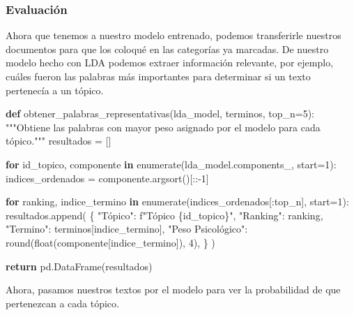 \documentclass[
  spanish,
  letterpaper,
  DIV=11,
  numbers=noendperiod]{scrartcl}
\newenvironment{Shaded}{\begin{snugshade}}{\end{snugshade}}
\newcommand{\BuiltInTok}[1]{\textcolor[rgb]{0.00,0.23,0.31}{#1}}
\newcommand{\CommentTok}[1]{\textcolor[rgb]{0.37,0.37,0.37}{#1}}
\newcommand{\ControlFlowTok}[1]{\textcolor[rgb]{0.00,0.23,0.31}{\textbf{#1}}}
\newcommand{\DecValTok}[1]{\textcolor[rgb]{0.68,0.00,0.00}{#1}}
\newcommand{\KeywordTok}[1]{\textcolor[rgb]{0.00,0.23,0.31}{\textbf{#1}}}
\newcommand{\NormalTok}[1]{\textcolor[rgb]{0.00,0.23,0.31}{#1}}
\newcommand{\OperatorTok}[1]{\textcolor[rgb]{0.37,0.37,0.37}{#1}}
\newcommand{\SpecialCharTok}[1]{\textcolor[rgb]{0.37,0.37,0.37}{#1}}
\newcommand{\SpecialStringTok}[1]{\textcolor[rgb]{0.13,0.47,0.30}{#1}}
\newcommand{\StringTok}[1]{\textcolor[rgb]{0.13,0.47,0.30}{#1}}
\begin{document}
\subsubsection{Evaluación}\label{evaluaciuxf3n}

Ahora que tenemos a nuestro modelo entrenado, podemos transferirle
nuestros documentos para que los coloqué en las categorías ya marcadas.
De nuestro modelo hecho con LDA podemos extraer información relevante,
por ejemplo, cuáles fueron las palabras más importantes para determinar
si un texto pertenecía a un tópico.

\begin{Shaded}
\begin{Highlighting}[]
\KeywordTok{def}\NormalTok{ obtener\_palabras\_representativas(lda\_model, terminos, top\_n}\OperatorTok{=}\DecValTok{5}\NormalTok{):}
    \CommentTok{"""Obtiene las palabras con mayor peso asignado por el modelo para cada tópico."""}
\NormalTok{    resultados }\OperatorTok{=}\NormalTok{ []}

    \ControlFlowTok{for}\NormalTok{ id\_topico, componente }\KeywordTok{in} \BuiltInTok{enumerate}\NormalTok{(lda\_model.components\_, start}\OperatorTok{=}\DecValTok{1}\NormalTok{):}
\NormalTok{        indices\_ordenados }\OperatorTok{=}\NormalTok{ componente.argsort()[::}\OperatorTok{{-}}\DecValTok{1}\NormalTok{]}
        
        \ControlFlowTok{for}\NormalTok{ ranking, indice\_termino }\KeywordTok{in} \BuiltInTok{enumerate}\NormalTok{(indices\_ordenados[:top\_n], start}\OperatorTok{=}\DecValTok{1}\NormalTok{):}
\NormalTok{            resultados.append(}
\NormalTok{                \{}
                    \StringTok{"Tópico"}\NormalTok{: }\SpecialStringTok{f"Tópico }\SpecialCharTok{\{}\NormalTok{id\_topico}\SpecialCharTok{\}}\SpecialStringTok{"}\NormalTok{,}
                    \StringTok{"Ranking"}\NormalTok{: ranking,}
                    \StringTok{"Termino"}\NormalTok{: terminos[indice\_termino],}
                    \StringTok{"Peso Psicológico"}\NormalTok{: }\BuiltInTok{round}\NormalTok{(}\BuiltInTok{float}\NormalTok{(componente[indice\_termino]), }\DecValTok{4}\NormalTok{),}
\NormalTok{                \}}
\NormalTok{            )}

    \ControlFlowTok{return}\NormalTok{ pd.DataFrame(resultados)}
\end{Highlighting}
\end{Shaded}

Ahora, pasamos nuestros textos por el modelo para ver la probabilidad de
que pertenezcan a cada tópico.
\end{document}
